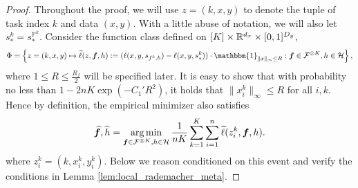 \documentclass[11pt]{article}
\numberwithin{equation}{section}
\renewcommand{\P}{\mathbb{P}}
\begin{document}
\begin{proof}
    Throughout the proof, we will use $z=(k,x,y)$ to denote the tuple of task index $k$ and data $(x,y)$.
    With a little abuse of notation, we will also let $s_*^k=s_*^{\P^k}$. 
    Consider the function class defined on $[K]\times\mathbb{R}^{d_x}\times[0,1]^{D_y}$,
    \begin{equation}
        \Phi=\left\{z=(k,x,y)\mapsto \widetilde{\ell}(z,\vf,h):=(\ell(x,y,s_{f^k,h})-\ell(x,y,s_*^k))\cdot\mathbbm{1}_{\|x\|_\infty\leq R}: \vf\in\mathcal{F}^{\otimes K},h\in\mathcal{H}\right\},
    \end{equation}
    where $1\leq R\leq \frac{R_f}{2}$ will be specified later. 
    It is easy to show that with probability no less than $1-2nK\exp(-C_1'R^2)$, it holds that $\|x_i^k\|_\infty\leq R$ for all $i,k$. 
    Hence by definition, the empirical minimizer also satisfies
    \begin{equation}
        \widehat{{\bm{f}}},\widehat{h}=\operatorname*{arg\,min}_{{\bm{f}}\in\mathcal{F}^{\otimes K},h\in\mathcal{H}} \frac{1}{nK}\sum_{k=1}^K\sum_{i=1}^n\widetilde{\ell}(z_i^k,{\bm{f}},h).
    \end{equation}
    where $z_i^k=(k,x_i^k,y_i^k)$. 
    Below we reason conditioned on this event and verify the conditions in Lemma \ref{lem:local_rademacher_meta}.


\end{proof}
\end{document}
